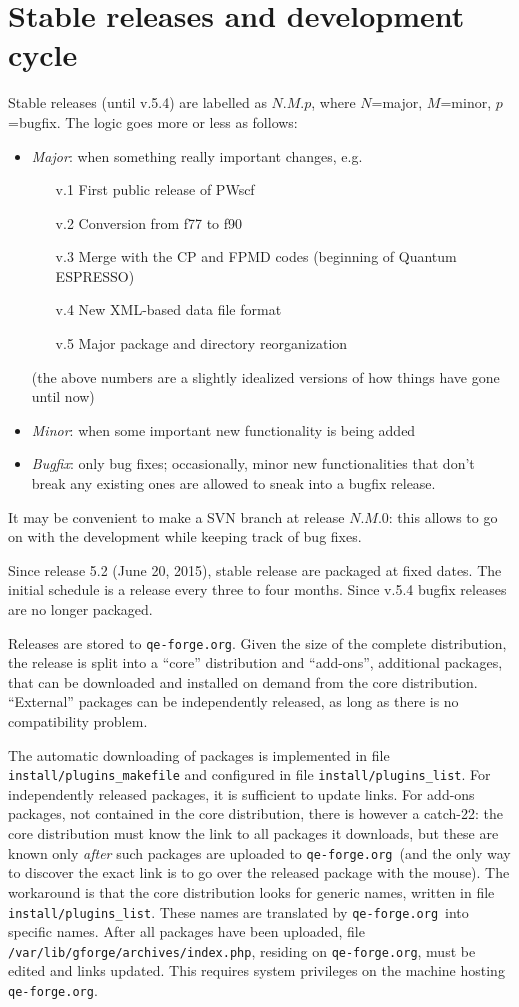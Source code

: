 \documentclass[12pt,a4paper]{article}
\def\qe{{\sc Quantum ESPRESSO}}
\def\qeforge{\texttt{qe-forge.org}}
\begin{document}
\section{Stable releases and development cycle}
Stable releases (until v.5.4) are labelled as $N.M.p$, where $N$=major,
$M$=minor, $p$=bugfix. The logic goes more or less as follows:
\begin{itemize}
\item {\em Major}: when something really important changes, e.g.
\begin{enumerate}
\item[v.1] First public release of PWscf
\item[v.2] Conversion from f77 to f90
\item[v.3] Merge with the CP and FPMD codes (beginning of \qe)
\item[v.4] New XML-based data file format
\item[v.5] Major package and directory reorganization
\end{enumerate}
(the above numbers are a slightly idealized versions of how things have
gone until now)
\item {\em Minor}: when some important new functionality is being added
\item {\em Bugfix}: only bug fixes; occasionally, minor new functionalities
that don't break any existing ones are allowed to sneak into a bugfix release.
\end{itemize}
It may be convenient to make a SVN branch at release $N.M.0$: this allows
to go on with the development while keeping track of bug fixes.

Since release 5.2 (June 20, 2015), stable release are packaged at
fixed dates. The initial schedule is a release every three to four months.
Since v.5.4 bugfix releases are no longer packaged.

Releases are stored to \qeforge. Given the size of the complete distribution,
the release is split into a ``core'' distribution and ``add-ons'',
additional packages, that can be downloaded and installed on demand
from the core distribution. ``External'' packages can be independently
released, as long as there is no compatibility problem.

The automatic downloading of packages is implemented in file
\texttt{install/plugins\_makefile} and configured in file
\texttt{install/plugins\_list}. For independently released packages,
it is sufficient to update links. For add-ons packages, not contained
in the core distribution, there is however a catch-22:
the core distribution must know the link to all packages it downloads,
but these are known only {\em after} such packages are uploaded to
\qeforge\ (and the only way to discover the exact link is to go over
the released package with the mouse).
The workaround is that the core distribution looks for generic names,
written in file \texttt{install/plugins\_list}. These names are translated
by \qeforge\ into specific names. After all packages have been uploaded,
file \texttt{/var/lib/gforge/archives/index.php}, residing on \qeforge,
must be edited and links updated. This requires system privileges on
the machine hosting \qeforge.
\end{document}
